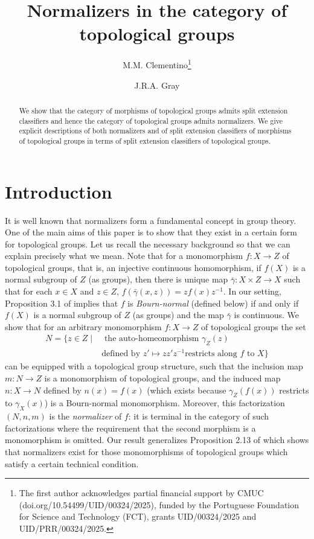 \documentclass{article}
\begin{document}
\title{Normalizers in the category of topological groups}
\author[1]{M.M. Clementino\thanks{The first author acknowledges partial financial support by CMUC (doi.org/10.54499/UID/00324/2025), funded by the Portuguese
Foundation for Science and Technology (FCT), grants UID/00324/2025 and UID/PRR/00324/2025.}}
\author[2]{J.R.A. Gray}
\maketitle
\begin{abstract}
We show that the category of morphisms of topological groups admits
split extension classifiers and hence the category of topological groups admits normalizers. 
We give explicit descriptions of both normalizers and of split extension classifiers of morphisms
of topological groups in terms of split extension classifiers of topological groups.
\end{abstract}
\section{Introduction}
It is well known that normalizers form a fundamental concept in group theory.
One of the main aims of this paper is to show that they exist in a certain form for
topological groups. Let us recall the necessary background so that we can explain
precisely what we mean. Note that for a monomorphism  $f:X\to Z$ of topological groups,
that is, an injective continuous homomorphism, if
$f(X)$ is a normal subgroup of $Z$ (as groups), then there is
unique map $\bar \gamma : X\times Z\to X$ such that for each $x\in X$ and $z\in Z$,
$f(\bar \gamma(x,z))=zf(x)z^{-1}$. In our setting, Proposition 3.1 of \cite{BOURN:2006} 
implies that $f$ is \emph{Bourn-normal} (defined below) if and only if $f(X)$ is a normal subgroup of $Z$ (as groups)
and the map $\bar \gamma$ is continuous.
We show that for an arbitrary monomorphism
$f:X\to Z$ of topological groups the set
\begin{align*}
N=\{z \in Z\mid& \text{ the auto-homeomorphism $\gamma_Z(z)$}\\
&\text{defined by $z'\mapsto zz'z^{-1}$
restricts along $f$ to $X$}\}
\end{align*}
can be equipped with a topological group structure, such that the inclusion
map $m:N\to Z$ is a monomorphism of topological groups, and the induced map $n:X\to N$
defined by $n(x)=f(x)$ (which exists because $\gamma_Z(f(x))$ restricts to $\gamma_X(x)$)
is a Bourn-normal monomorphism. Moreover, this factorization $(N,n,m)$ is the \emph{normalizer}
of $f$: it is terminal in the category of such factorizations where the requirement that the second
morphism is a monomorphism is omitted. Our result generalizes Proposition 2.13 of
\cite{BOURN_GRAY:2015} which shows that normalizers exist for those 
monomorphisms of topological groups which satisfy a certain technical condition.
\end{document}
